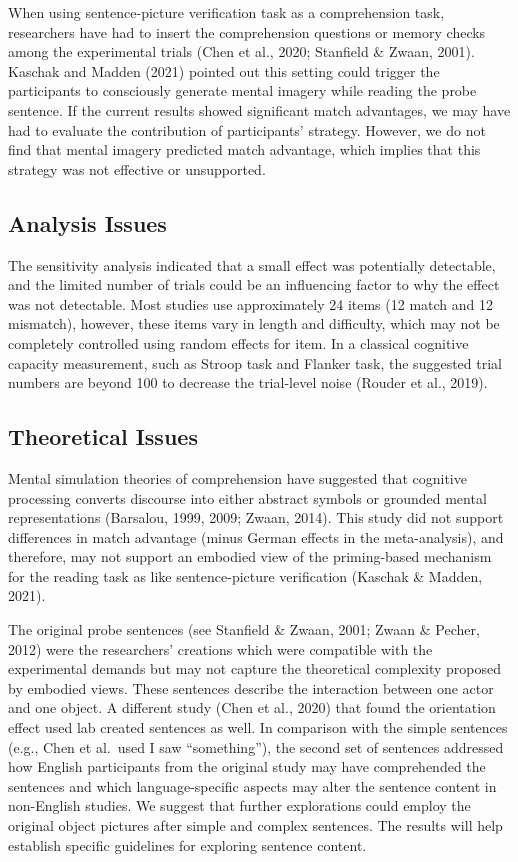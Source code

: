 \documentclass[
  man,floatsintext]{apa7}
\begin{document}
When using sentence-picture verification task as a comprehension task, researchers have had to insert the comprehension questions or memory checks among the experimental trials (Chen et al., 2020; Stanfield \& Zwaan, 2001). Kaschak and Madden (2021) pointed out this setting could trigger the participants to consciously generate mental imagery while reading the probe sentence. If the current results showed significant match advantages, we may have had to evaluate the contribution of participants' strategy. However, we do not find that mental imagery predicted match advantage, which implies that this strategy was not effective or unsupported.

\hypertarget{analysis-issues}{%
\subsection{Analysis Issues}\label{analysis-issues}}

The sensitivity analysis indicated that a small effect was potentially detectable, and the limited number of trials could be an influencing factor to why the effect was not detectable. Most studies use approximately 24 items (12 match and 12 mismatch), however, these items vary in length and difficulty, which may not be completely controlled using random effects for item. In a classical cognitive capacity measurement, such as Stroop task and Flanker task, the suggested trial numbers are beyond 100 to decrease the trial-level noise (Rouder et al., 2019).

\hypertarget{theoretical-issues}{%
\subsection{Theoretical Issues}\label{theoretical-issues}}

Mental simulation theories of comprehension have suggested that cognitive processing converts discourse into either abstract symbols or grounded mental representations (Barsalou, 1999, 2009; Zwaan, 2014). This study did not support differences in match advantage (minus German effects in the meta-analysis), and therefore, may not support an embodied view of the priming-based mechanism for the reading task as like sentence-picture verification (Kaschak \& Madden, 2021).

The original probe sentences (see Stanfield \& Zwaan, 2001; Zwaan \& Pecher, 2012) were the researchers' creations which were compatible with the experimental demands but may not capture the theoretical complexity proposed by embodied views. These sentences describe the interaction between one actor and one object. A different study (Chen et al., 2020) that found the orientation effect used lab created sentences as well. In comparison with the simple sentences (e.g., Chen et al.~used I saw ``something''), the second set of sentences addressed how English participants from the original study may have comprehended the sentences and which language-specific aspects may alter the sentence content in non-English studies. We suggest that further explorations could employ the original object pictures after simple and complex sentences. The results will help establish specific guidelines for exploring sentence content.
\end{document}
